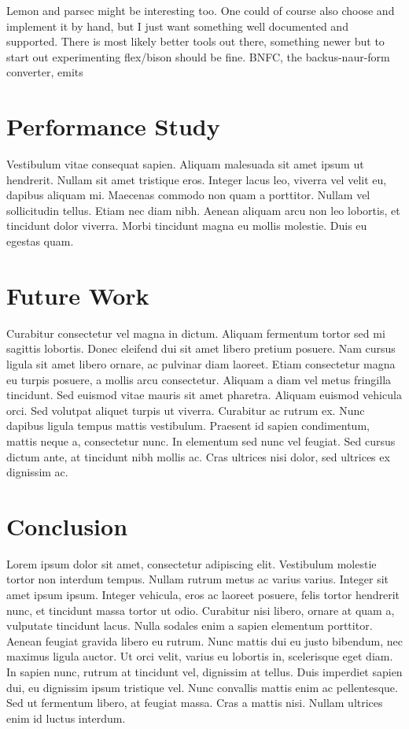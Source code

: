 \documentclass{sigplanconf}
\begin{document}
Lemon\cite{cc:lemon} and parsec\cite{cc:parsec} might be interesting too.  One could of course also choose and implement it by hand, but I just want something well documented and supported. There is most likely better tools out there, something newer but to start out experimenting flex/bison should be fine. BNFC, the backus-naur-form converter, emits 

\section{Performance Study}

Vestibulum vitae consequat sapien. Aliquam malesuada sit amet ipsum ut hendrerit. Nullam sit amet tristique eros. Integer lacus leo, viverra vel velit eu, dapibus aliquam mi. Maecenas commodo non quam a porttitor. Nullam vel sollicitudin tellus. Etiam nec diam nibh. Aenean aliquam arcu non leo lobortis, et tincidunt dolor viverra. Morbi tincidunt magna eu mollis molestie. Duis eu egestas quam.

\section{Future Work}

Curabitur consectetur vel magna in dictum. Aliquam fermentum tortor sed mi sagittis lobortis. Donec eleifend dui sit amet libero pretium posuere. Nam cursus ligula sit amet libero ornare, ac pulvinar diam laoreet. Etiam consectetur magna eu turpis posuere, a mollis arcu consectetur. Aliquam a diam vel metus fringilla tincidunt. Sed euismod vitae mauris sit amet pharetra. Aliquam euismod vehicula orci. Sed volutpat aliquet turpis ut viverra. Curabitur ac rutrum ex. Nunc dapibus ligula tempus mattis vestibulum. Praesent id sapien condimentum, mattis neque a, consectetur nunc. In elementum sed nunc vel feugiat. Sed cursus dictum ante, at tincidunt nibh mollis ac. Cras ultrices nisi dolor, sed ultrices ex dignissim ac.

\section{Conclusion}

Lorem ipsum dolor sit amet, consectetur adipiscing elit. Vestibulum molestie tortor non interdum tempus. Nullam rutrum metus ac varius varius. Integer sit amet ipsum ipsum. Integer vehicula, eros ac laoreet posuere, felis tortor hendrerit nunc, et tincidunt massa tortor ut odio. Curabitur nisi libero, ornare at quam a, vulputate tincidunt lacus. Nulla sodales enim a sapien elementum porttitor. Aenean feugiat gravida libero eu rutrum. Nunc mattis dui eu justo bibendum, nec maximus ligula auctor. Ut orci velit, varius eu lobortis in, scelerisque eget diam. In sapien nunc, rutrum at tincidunt vel, dignissim at tellus. Duis imperdiet sapien dui, eu dignissim ipsum tristique vel. Nunc convallis mattis enim ac pellentesque. Sed ut fermentum libero, at feugiat massa. Cras a mattis nisi. Nullam ultrices enim id luctus interdum.
\end{document}

